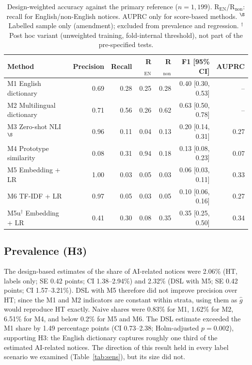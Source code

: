 \documentclass[runningheads]{llncs}
\begin{document}
\begin{table}[t]
\caption{Design-weighted accuracy against the primary reference ($n=1{,}199$). R$_\mathrm{EN}$/R$_\mathrm{non}$: recall for English/non-English notices. AUPRC only for score-based methods. $^\S$Labelled sample only (amendment); excluded from prevalence and regression. $^\dagger$Post hoc variant (unweighted training, fold-internal threshold), not part of the pre-specified tests.}\label{tab:acc}
\centering
\begin{tabular}{lrrrrrr}
\toprule
Method & Precision & Recall & R$_\mathrm{EN}$ & R$_\mathrm{non}$ & F1 [95\% CI] & AUPRC \\
\midrule
M1 English dictionary & 0.69 & 0.28 & 0.25 & 0.28 & 0.40 [0.30, 0.53] & -- \\
M2 Multilingual dictionary & 0.71 & 0.56 & 0.26 & 0.62 & 0.63 [0.50, 0.78] & -- \\
M3 Zero-shot NLI$^\S$ & 0.96 & 0.11 & 0.04 & 0.13 & 0.20 [0.14, 0.31] & 0.27 \\
M4 Prototype similarity & 0.08 & 0.31 & 0.94 & 0.18 & 0.13 [0.08, 0.23] & 0.07 \\
M5 Embedding + LR & 1.00 & 0.03 & 0.05 & 0.03 & 0.06 [0.03, 0.11] & 0.33 \\
M6 TF-IDF + LR & 0.97 & 0.05 & 0.03 & 0.05 & 0.10 [0.06, 0.16] & 0.27 \\
M5u$^\dagger$ Embedding + LR & 0.41 & 0.30 & 0.08 & 0.35 & 0.35 [0.25, 0.50] & 0.34 \\
\bottomrule
\end{tabular}
\end{table}

\subsection{Prevalence (H3)}
The design-based estimates of the share of AI-related notices were 2.06\% (HT, labels only; SE 0.42 points; CI 1.38--2.94\%) and 2.32\% (DSL with M5; SE 0.42 points; CI 1.57--3.21\%). DSL with M5 therefore did not improve precision over HT; since the M1 and M2 indicators are constant within strata, using them as $\hat{g}$ would reproduce HT exactly. Naive shares were 0.83\% for M1, 1.62\% for M2, 6.51\% for M4, and below 0.2\% for M5 and M6. The DSL estimate exceeded the M1 share by 1.49 percentage points (CI 0.73--2.38; Holm-adjusted $p=0.002$), supporting H3: the English dictionary captures roughly one third of the estimated AI-related notices. The direction of this result held in every label scenario we examined (Table~\ref{tab:sens}), but its size did not.
\end{document}
